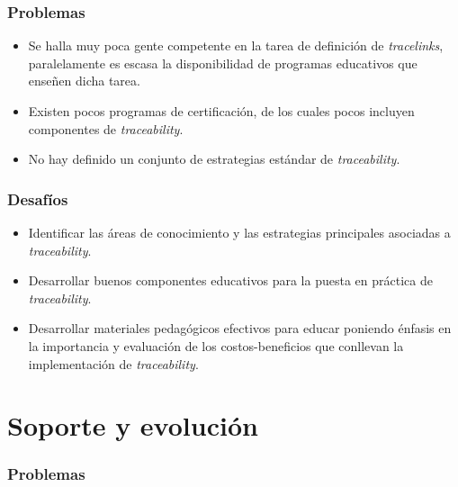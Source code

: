 \documentclass[a4paper,12pt,oneside,spanish]{book}
\begin{document}
\subsubsection{Problemas}

\begin{itemize}[label={$\times$}]
\item Se halla muy poca gente competente en la tarea de definición de \textit{tracelinks}, paralelamente es escasa la disponibilidad de programas educativos que enseñen dicha tarea.

\item Existen pocos programas de certificación, de los cuales pocos incluyen componentes de \textit{traceability}.

\item No hay definido un conjunto de estrategias estándar de \textit{traceability}.

\end{itemize}

\subsubsection{Desafíos}

\begin{itemize}[label={\checkmark}]
\item Identificar las áreas de conocimiento y las estrategias principales asociadas a \textit{traceability}.

\item Desarrollar buenos componentes educativos para la puesta en práctica de \textit{traceability}.

\item Desarrollar materiales pedagógicos efectivos para educar poniendo énfasis  en la importancia y evaluación de los costos-beneficios que conllevan la implementación de \textit{traceability}.

\end{itemize}

\section{Soporte y evolución}

\subsubsection{Problemas}
\end{document}
